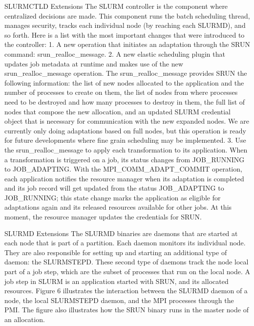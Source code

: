 SLURMCTLD Extensions
The SLURM controller is the component where centralized decisions are made. This component runs the batch scheduling thread, manages security, tracks each individual node (by reaching each SLURMD), and so forth. Here is a list with the most important changes that were introduced to the controller: 
1. A new operation that initiates an adaptation through the SRUN command: srun{\_}realloc{\_}message.
2. A new elastic scheduling plugin that updates job metadata at runtime and makes use of the new srun{\_}realloc{\_}message operation.
The srun{\_}realloc{\_}message provides SRUN the following information: the list of new nodes allocated to the application and the number of processes to create on them, the list of nodes from where processes need to be destroyed and how many processes to destroy in them, the full list of nodes that compose the new allocation, and an updated SLURM credential object that is necessary for communication with the new expanded nodes. We are currently only doing adaptations based on full nodes, but this operation is ready for future developments where fine grain scheduling may be implemented.
3. Use the srun{\_}realloc{\_}message to apply each transformation to its application. When a transformation is triggered on a job, its status
changes from JOB{\_}RUNNING to JOB{\_}ADAPTING. With the MPI{\_}COMM{\_}ADAPT{\_}COMMIT operation, each application notifies the resource manager when its adaptation is completed and its job record will get updated from the status JOB{\_}ADAPTING to JOB{\_}RUNNING; this state change marks the application as eligible for adaptations again and its released resources available for other jobs. At this moment, the resource manager
 updates the credentials for SRUN.

SLURMD Extensions
The SLURMD binaries are daemons that are started at each node that is part of a partition. Each daemon monitors its individual node. They are also responsible for setting up and starting an additional type of daemon: the SLURMSTEPD. These second type of daemons track the node local part of a job step, which are the subset of processes that run on the local node. A job step in SLURM is an application started with SRUN, and its allocated resources. Figure 6 illustrates the interaction between the SLURMD daemon of a node, the local SLURMSTEPD daemon, and the MPI processes through the PMI. The figure also illustrates how the SRUN binary runs in the master node of an allocation.

